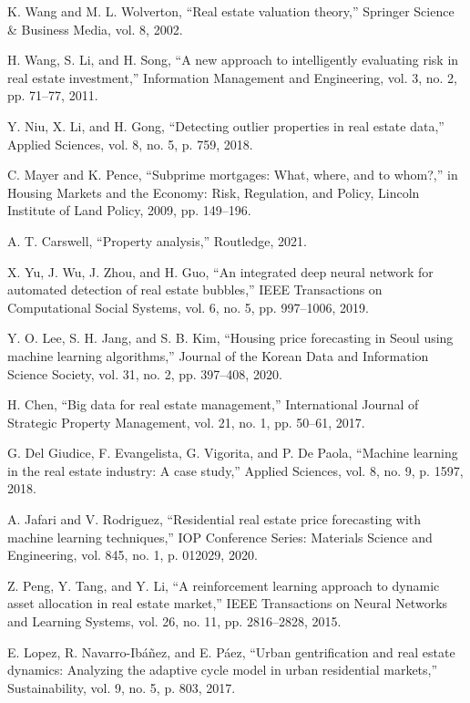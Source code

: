 \documentclass[conference]{IEEEtran}
\begin{document}
\begin{thebibliography}{00}
 K. Wang and M. L. Wolverton, ``Real estate valuation theory,'' Springer Science \& Business Media, vol. 8, 2002.

 H. Wang, S. Li, and H. Song, ``A new approach to intelligently evaluating risk in real estate investment,'' Information Management and Engineering, vol. 3, no. 2, pp. 71--77, 2011.

 Y. Niu, X. Li, and H. Gong, ``Detecting outlier properties in real estate data,'' Applied Sciences, vol. 8, no. 5, p. 759, 2018.

 C. Mayer and K. Pence, ``Subprime mortgages: What, where, and to whom?,'' in Housing Markets and the Economy: Risk, Regulation, and Policy, Lincoln Institute of Land Policy, 2009, pp. 149--196.

 A. T. Carswell, ``Property analysis,'' Routledge, 2021.

 X. Yu, J. Wu, J. Zhou, and H. Guo, ``An integrated deep neural network for automated detection of real estate bubbles,'' IEEE Transactions on Computational Social Systems, vol. 6, no. 5, pp. 997--1006, 2019.

 Y. O. Lee, S. H. Jang, and S. B. Kim, ``Housing price forecasting in Seoul using machine learning algorithms,'' Journal of the Korean Data and Information Science Society, vol. 31, no. 2, pp. 397--408, 2020.

 H. Chen, ``Big data for real estate management,'' International Journal of Strategic Property Management, vol. 21, no. 1, pp. 50--61, 2017.

 G. Del Giudice, F. Evangelista, G. Vigorita, and P. De Paola, ``Machine learning in the real estate industry: A case study,'' Applied Sciences, vol. 8, no. 9, p. 1597, 2018.

 A. Jafari and V. Rodriguez, ``Residential real estate price forecasting with machine learning techniques,'' IOP Conference Series: Materials Science and Engineering, vol. 845, no. 1, p. 012029, 2020.

 Z. Peng, Y. Tang, and Y. Li, ``A reinforcement learning approach to dynamic asset allocation in real estate market,'' IEEE Transactions on Neural Networks and Learning Systems, vol. 26, no. 11, pp. 2816--2828, 2015.

 E. Lopez, R. Navarro-Ibáñez, and E. Páez, ``Urban gentrification and real estate dynamics: Analyzing the adaptive cycle model in urban residential markets,'' Sustainability, vol. 9, no. 5, p. 803, 2017.


\end{thebibliography}
\end{document}
